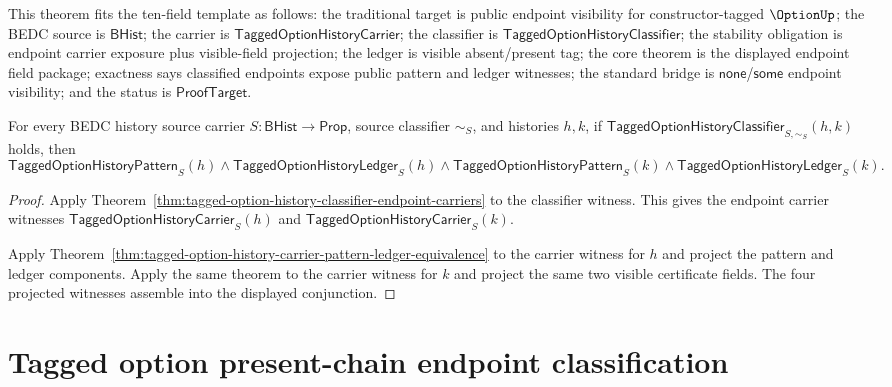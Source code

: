 \begin{theorem}
\label{thm:tagged-option-classifier-endpoint-visible-fields}
This theorem fits the ten-field template as follows: the traditional target is
public endpoint visibility for constructor-tagged $\OptionUp$; the BEDC source
is $\mathsf{BHist}$; the carrier is
$\mathsf{TaggedOptionHistoryCarrier}$; the classifier is
$\mathsf{TaggedOptionHistoryClassifier}$; the stability obligation is endpoint
carrier exposure plus visible-field projection; the ledger is visible
absent/present tag; the core theorem is the displayed endpoint field package;
exactness says classified endpoints expose public pattern and ledger witnesses;
the standard bridge is $\mathsf{none}$/$\mathsf{some}$ endpoint visibility; and
the status is $\mathsf{ProofTarget}$.

For every BEDC history source carrier $S:\mathsf{BHist}\to\mathsf{Prop}$,
source classifier $\sim_S$, and histories $h,k$, if
$\mathsf{TaggedOptionHistoryClassifier}_{S,\sim_S}(h,k)$ holds, then
$$
\mathsf{TaggedOptionHistoryPattern}_S(h)
\land
\mathsf{TaggedOptionHistoryLedger}_S(h)
\land
\mathsf{TaggedOptionHistoryPattern}_S(k)
\land
\mathsf{TaggedOptionHistoryLedger}_S(k).
$$
\end{theorem}
\begin{proof}
Apply Theorem~\ref{thm:tagged-option-history-classifier-endpoint-carriers} to
the classifier witness. This gives the endpoint carrier witnesses
$\mathsf{TaggedOptionHistoryCarrier}_S(h)$ and
$\mathsf{TaggedOptionHistoryCarrier}_S(k)$.

Apply
Theorem~\ref{thm:tagged-option-history-carrier-pattern-ledger-equivalence} to
the carrier witness for $h$ and project the pattern and ledger components.
Apply the same theorem to the carrier witness for $k$ and project the same two
visible certificate fields. The four projected witnesses assemble into the
displayed conjunction.
\end{proof}

\section{Tagged option present-chain endpoint classification}
\label{sec:option-present-chain-endpoint-classification}

